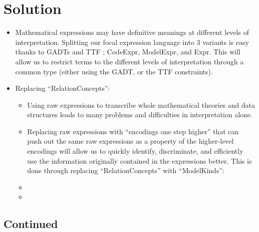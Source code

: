\section{Solution}

\begin{itemize}

	\item Mathematical expressions may have definitive meanings at different
	      levels of interpretation. Splitting our focal expression language into
	      3 variants is easy thanks to GADTs and TTF \cite{carette2009finally};
	      CodeExpr, ModelExpr, and Expr. This will allow us to restrict terms to
	      the different levels of interpretation through a common type (either
	      using the GADT, or the TTF constraints).

	\item Replacing ``RelationConcepts'':

	      \begin{itemize}

		      \item Using raw expressions to transcribe whole mathematical
		            theories and data structures leads to many problems and
		            difficulties in interpretation alone.

		      \item Replacing raw expressions with ``encodings one step higher''
		            that can push out the same raw expressions as a property of
		            the higher-level encodings will allow us to quickly
		            identify, discriminate, and efficiently use the information
		            originally contained in the expressions better. This is done
		            through replacing ``RelationConcepts'' with ``ModelKinds'':

		      \item \currentModelKindsHaskell

		      \item {}

	      \end{itemize}

\end{itemize}

\subsection{Continued}

